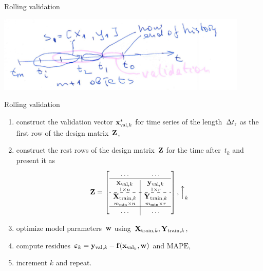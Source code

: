 \documentclass{beamer}
\begin{document}
\begin{frame}{Rolling validation}

\includegraphics[width=0.9\textwidth]{design_matrix_generation.png}


\end{frame}
\begin{frame}{Rolling validation}

\begin{enumerate}[1)]
\item construct the validation vector ${\mathbf{x}}^*_{\text{val},k}$ for time series of the length~$\Delta t_\text{r}$ as the first row of the design matrix~${\mathbf{Z}}$,
\item construct the rest rows of the design matrix~${\mathbf{Z}}$ for the time after~$t_k$ and present it as
 \[\bZ = \left[\begin{array}{c|c}
 \dots & \dots \\
 \hline
 \underset{1{\times}n}{\bx_{\text{val}, k}} & \underset{1{\times}r}{\by_{\text{val}, k}}  \\
 \hdashline
 \underset{m_{\min}{\times}n}{\bX_{\text{train}, k}}  & \underset{m_{\min}{\times}r}{\bY_{\text{train}, k}} \\
 \hline
 \dots & \dots \\
 \end{array}\right], \Big{\uparrow}_{k}
 \]
\item optimize model parameters~$\mathbf{w}$ using~${\mathbf{X}}_{\text{train}, k}, \mathbf{Y}_{\text{train}, k}$,
\item compute residues~${\boldsymbol{\varepsilon}}_k = {\mathbf{y}}_{\text{val}, k} - {\mathbf{f}}({\mathbf{x}}_{\text{val}_k}, \mathbf{w})$ and $\text{MAPE}$,
\item increment $k$ and repeat.
\end{enumerate}

\end{frame}
\end{document}
